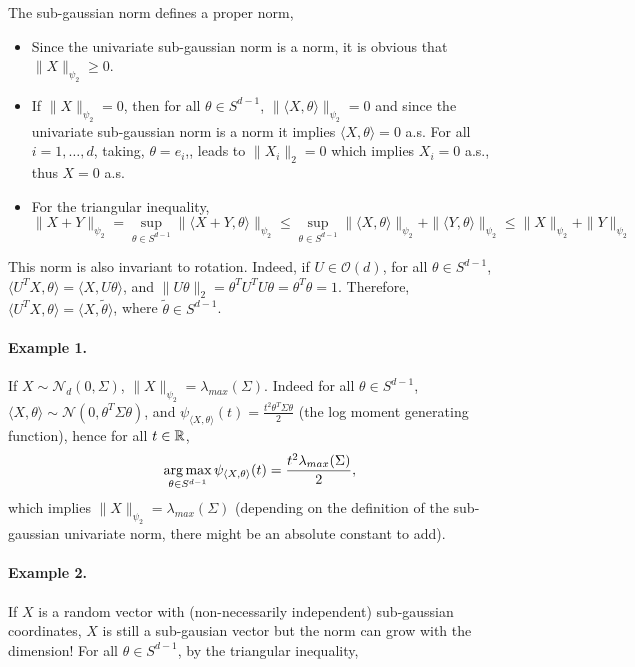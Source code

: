 \documentclass{article}
\begin{document}
The sub-gaussian norm defines a proper norm,
\begin{itemize}
\item Since the univariate sub-gaussian norm is a norm, it is obvious that $\|X\|_{\psi_2}
  \geq 0$.
\item If $\|X\|_{\psi_2} = 0$, then for all $\theta \in S^{d-1}$, $\|\langle
  X,\theta \rangle\|_{\psi_2} = 0$ and since the univariate sub-gaussian norm is a
  norm it implies $\langle X,\theta \rangle = 0$ a.s. For all $i=1,\ldots,d$,
  taking, $\theta = e_i$,, leads to $\|X_i\|_2 = 0$ which implies $X_i = 0$
  a.s., thus $X=0$ a.s.
\item For the triangular inequality, $$\|X + Y\|_{\psi_2} =\sup _{\theta \in S^{d-1}}\|\langle X+Y,
  \theta\rangle\|_{\psi_{2}} \leq \sup _{\theta \in S^{d-1}}\|\langle X,
  \theta\rangle\|_{\psi_{2}} + \|\langle Y,\theta\rangle\|_{\psi_{2}} \leq \|X\|_{\psi_2} + \|Y\|_{\psi_2}$$ 
\end{itemize}

This norm is also invariant to rotation. Indeed, if $U \in \mathcal{O}(d)$, for
all $\theta \in S^{d-1}$, $\langle U^TX,\theta \rangle = \langle X,U\theta
\rangle$, and $\|U\theta\|_2 = \theta^TU^TU\theta = \theta^T\theta = 1$.
Therefore, $\langle U^TX,\theta \rangle = \langle X,\tilde{\theta}\rangle$,
where $\tilde{\theta} \in S^{d-1}$. 

\paragraph{Example 1.} If $X \sim \mathcal{N}_d(0,\Sigma)$, $\|X\|_{\psi_2} = \lambda_{max}(\Sigma)$. Indeed for all $\theta \in S^{d-1}$, $\langle X,\theta \rangle
\sim \mathcal{N}(0,\theta^T\Sigma\theta)$, and $\psi_{\langle X,\theta
  \rangle}(t) = \frac{t^2\theta^T\Sigma\theta}{2}$ (the log moment generating function), hence for all $t \in \mathbb{R}$, $$\operatorname*{arg\,max}_{\theta \in
  S^{d-1}} \psi_{\langle X,\theta\rangle}(t) =  \frac{t^2
  \lambda_{max}(\Sigma)}{2},$$ which implies $\|X\|_{\psi_2} =
\lambda_{max}(\Sigma)$ (depending on the definition of the sub-gaussian
univariate norm, there might be an absolute constant to add).

\paragraph{Example 2.} If $X$ is a random vector with (non-necessarily
independent) sub-gaussian coordinates, $X$ is still a sub-gausian vector but the
norm can grow with the dimension! For all $\theta \in S^{d-1}$, by the
triangular inequality,
\end{document}
